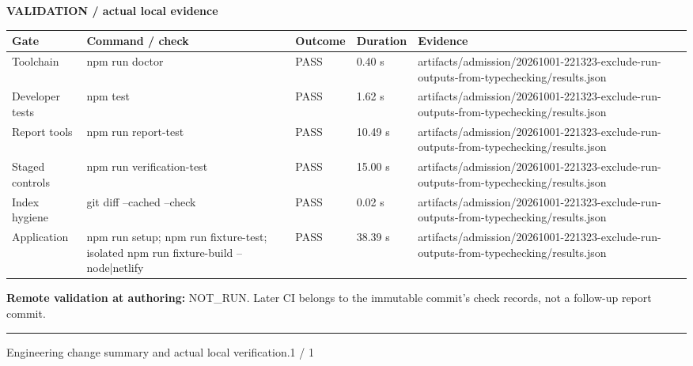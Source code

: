 \documentclass[10pt,a4paper]{article}
\begin{document}
\vspace{9pt}
{\sffamily\small\bfseries\color{ink}VALIDATION / actual local evidence}\par
{\footnotesize
\begin{tabularx}{\linewidth}{@{}p{18mm}Yp{23mm}p{15mm}p{28mm}@{}}
\toprule
\textbf{Gate} & \textbf{Command / check} & \textbf{Outcome} & \textbf{Duration} & \textbf{Evidence} \\
\midrule
Toolchain & npm run doctor & PASS & 0.40 s & artifacts/\allowbreak{}admission/\allowbreak{}20261001-221323-exclude-run-outputs-from-typechecking/\allowbreak{}results.json \\
Developer tests & npm test & PASS & 1.62 s & artifacts/\allowbreak{}admission/\allowbreak{}20261001-221323-exclude-run-outputs-from-typechecking/\allowbreak{}results.json \\
Report tools & npm run report-test & PASS & 10.49 s & artifacts/\allowbreak{}admission/\allowbreak{}20261001-221323-exclude-run-outputs-from-typechecking/\allowbreak{}results.json \\
Staged controls & npm run verification-test & PASS & 15.00 s & artifacts/\allowbreak{}admission/\allowbreak{}20261001-221323-exclude-run-outputs-from-typechecking/\allowbreak{}results.json \\
Index hygiene & git diff --cached --check & PASS & 0.02 s & artifacts/\allowbreak{}admission/\allowbreak{}20261001-221323-exclude-run-outputs-from-typechecking/\allowbreak{}results.json \\
Application & npm run setup; npm run fixture-test; isolated npm run fixture-build -- node|netlify & PASS & 38.39 s & artifacts/\allowbreak{}admission/\allowbreak{}20261001-221323-exclude-run-outputs-from-typechecking/\allowbreak{}results.json \\
\bottomrule
\end{tabularx}}\par
\vspace{5pt}
{\footnotesize\color{muted}\textbf{Remote validation at authoring:} NOT\_RUN. Later CI belongs to the immutable commit's check records, not a follow-up report commit.}\par
\vfill
{\color{line}\hrule height 0.6pt}
\vspace{4pt}
{\sffamily\footnotesize\color{muted}Engineering change summary and actual local verification.\hfill 1 / 1}
\end{document}
